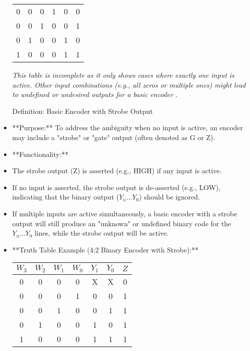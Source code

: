 \documentclass{article}
\begin{document}
\begin{itemize}
\begin{tabular}{|cccc|cc|}
 0 & 0 & 0 & 1 & 0 & 0 \\ 0 & 0 & 1 & 0 & 0 & 1 \\ 0 & 1 & 0 & 0 & 1 & 0 \\ 1 & 0 & 0 & 0 & 1 & 1 \\ \hline

\end{tabular}

 \textit{This table is incomplete as it only shows cases where exactly one input is active. Other input combinations (e.g., all zeros or multiple ones) might lead to undefined or undesired outputs for a basic encoder} \textit{.}

Definition: Basic Encoder with Strobe Output

\item **Purpose:** To address the ambiguity when no input is active, an encoder may include a "strobe" or "gate" output (often denoted as G or Z).

\item **Functionality:**

    \item The strobe output (Z) is asserted (e.g., HIGH) if any input is active.

    \item If no input is asserted, the strobe output is de-asserted (e.g., LOW), indicating that the binary output ($Y_n \dots Y_0$) should be ignored.

    \item If multiple inputs are active simultaneously, a basic encoder with a strobe output will still produce an "unknown" or undefined binary code for the $Y_n \dots Y_0$ lines, while the strobe output will be active.

\item **Truth Table Example (4:2 Binary Encoder with Strobe):** \begin{tabular}{|cccc|ccc|} \\ \hline
 $W_3$ & $W_2$ & $W_1$ & $W_0$ & $Y_1$ & $Y_0$ & $Z$ \\ \hline

 0 & 0 & 0 & 0 & X & X & 0 \\ 0 & 0 & 0 & 1 & 0 & 0 & 1 \\ 0 & 0 & 1 & 0 & 0 & 1 & 1 \\ 0 & 1 & 0 & 0 & 1 & 0 & 1 \\ 1 & 0 & 0 & 0 & 1 & 1 & 1 \\ \hline

\end{tabular}


\end{itemize}
\end{document}
